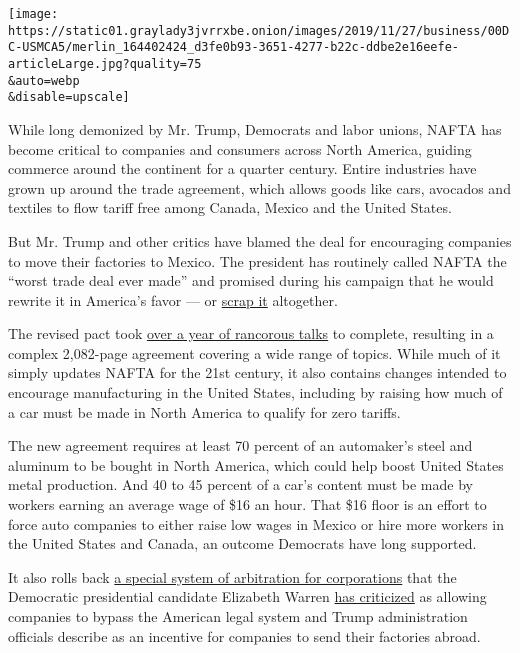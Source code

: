 \texttt{[image: https://static01.graylady3jvrrxbe.onion/images/2019/11/27/business/00DC-USMCA5/merlin\_164402424\_d3fe0b93-3651-4277-b22c-ddbe2e16eefe-articleLarge.jpg?quality=75\\\&auto=webp\\\&disable=upscale]}

While long demonized by Mr. Trump, Democrats and labor unions, NAFTA has
become critical to companies and consumers across North America, guiding
commerce around the continent for a quarter century. Entire industries
have grown up around the trade agreement, which allows goods like cars,
avocados and textiles to flow tariff free among Canada, Mexico and the
United States.

But Mr. Trump and other critics have blamed the deal for encouraging
companies to move their factories to Mexico. The president has routinely
called NAFTA the ``worst trade deal ever made'' and promised during his
campaign that he would rewrite it in America's favor --- or
\href{https://www.nytimes3xbfgragh.onion/2018/12/02/us/politics/trump-withdraw-nafta.html}{scrap
it} altogether.

The revised pact took
\href{https://www.nytimes3xbfgragh.onion/2018/09/30/us/politics/us-canada-nafta-deal-deadline.html}{over
a year of rancorous talks} to complete, resulting in a complex
2,082-page agreement covering a wide range of topics. While much of it
simply updates NAFTA for the 21st century, it also contains changes
intended to encourage manufacturing in the United States, including by
raising how much of a car must be made in North America to qualify for
zero tariffs.

The new agreement requires at least 70 percent of an automaker's steel
and aluminum to be bought in North America, which could help boost
United States metal production. And 40 to 45 percent of a car's content
must be made by workers earning an average wage of \$16 an hour. That
\$16 floor is an effort to force auto companies to either raise low
wages in Mexico or hire more workers in the United States and Canada, an
outcome Democrats have long supported.

It also rolls back
\href{https://www.nytimes3xbfgragh.onion/2017/10/16/us/politics/nafta-united-states-canada.html}{a
special system of arbitration for corporations} that the Democratic
presidential candidate Elizabeth Warren
\href{https://www.warren.senate.gov/newsroom/press-releases/warren-urges-us-trade-rep-to-remove-isds-provisions-during-next-round-of-nafta-negotiations}{has
criticized} as allowing companies to bypass the American legal system
and Trump administration officials describe as an incentive for
companies to send their factories abroad.

